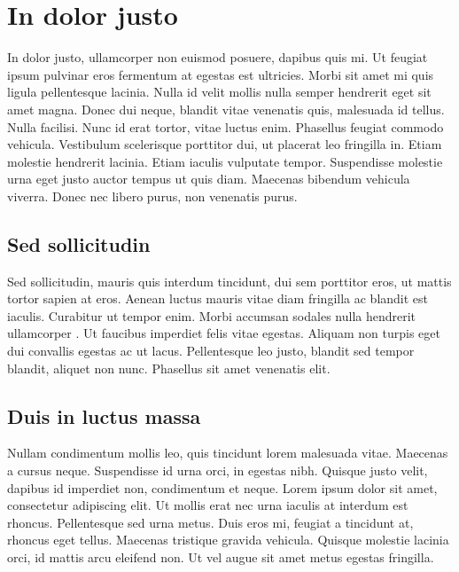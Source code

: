 \section{In dolor justo}

In dolor justo, ullamcorper non euismod posuere, dapibus quis mi. Ut feugiat ipsum pulvinar eros fermentum at egestas est ultricies. Morbi sit amet \cite{AMA75} mi quis ligula pellentesque lacinia. Nulla id velit mollis nulla semper hendrerit eget sit amet magna. Donec dui neque, blandit vitae venenatis quis, malesuada id tellus. Nulla facilisi. Nunc id erat tortor, vitae luctus enim. Phasellus feugiat commodo vehicula. Vestibulum scelerisque porttitor dui, ut placerat leo fringilla in. Etiam molestie hendrerit lacinia. Etiam iaculis vulputate tempor. Suspendisse molestie urna eget justo auctor tempus ut quis diam. Maecenas bibendum vehicula viverra. Donec nec libero purus, non venenatis purus. 

\subsection{Sed sollicitudin}

Sed sollicitudin, mauris quis interdum tincidunt, dui sem porttitor eros, ut mattis tortor sapien at eros. Aenean luctus mauris vitae diam fringilla ac blandit est iaculis. Curabitur ut tempor enim. Morbi accumsan sodales nulla hendrerit ullamcorper \cite{LAI01}. Ut faucibus imperdiet felis vitae egestas. Aliquam non turpis eget dui convallis egestas ac ut lacus. Pellentesque leo justo, blandit sed tempor blandit, aliquet non nunc. Phasellus sit amet venenatis elit. 

\subsection{Duis in luctus massa}

Nullam condimentum mollis leo, quis tincidunt lorem malesuada vitae. Maecenas a cursus neque. Suspendisse id urna orci, in egestas nibh. Quisque justo velit, dapibus id imperdiet non, condimentum et neque. Lorem ipsum dolor sit amet, consectetur adipiscing elit. Ut mollis erat nec urna iaculis at interdum est rhoncus. Pellentesque sed urna metus. Duis eros mi, feugiat a tincidunt at, rhoncus eget tellus. Maecenas tristique gravida vehicula. Quisque molestie lacinia orci, id mattis arcu eleifend non. Ut vel augue sit amet metus egestas fringilla. 

